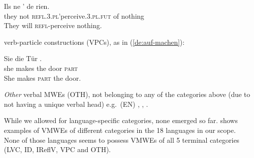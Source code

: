 \documentclass[output=paper,
modfonts,
]{langscibook}
\begin{document}
\begin{senum}
\begin{senum}
\ea \label{fr:se-apercevoir}
\settowidth {} 
\gll Ils ne ' de rien. \\
they not \textsc{refl.3.pl}'perceive.\textsc{3.pl.fut} of nothing \\ 
\glt They will \textsc{refl}-perceive nothing. 
\z

\item verb-particle constructions (VPCs), as in (\ref{de:auf-machen}):

\ea \label{de:auf-machen}
\settowidth {} 
\gll Sie  die Tür . \\
she makes the door \textsc{part} \\ 
\glt She makes \textsc{part} the door. 
\z

\end{senum}
\item \textit{Other} verbal MWEs (OTH), not belonging to any of the categories above (due to not having a unique verbal head) e.g.\ (EN) , , .
\end{senum}


While we allowed for language-specific categories, %
none emerged so far. %
 shows examples of VMWEs of different categories in the 18 languages in our scope. None of those languages seems to possess VMWEs of all 5 terminal categories (LVC, ID, IReflV, VPC and OTH). 
\end{document}
